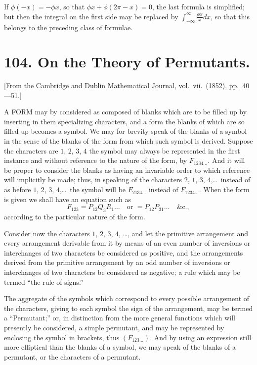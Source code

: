 \documentclass[11pt,a4paper]{article}
\theoremstyle{plain}
\begin{document}
If $\phi(-x) = -\phi x$, so that $\phi x + \phi(2\pi - x) = 0$, the last formula is simplified; but then the integral on the first side may be replaced by $\int_{-\infty}^{\infty} \frac{\phi x}{x} dx$, so that this belongs to the preceding class of formulae.
\clearpage


\section*{104. On the Theory of Permutants.}

[From the Cambridge and Dublin Mathematical Journal, vol.\ vii.\ (1852), pp.\ 40---51.]

A FORM may by considered as composed of blanks which are to be filled up by inserting in them specializing characters, and a form the blanks of which are so filled up becomes a symbol. We may for brevity speak of the blanks of a symbol in the sense of the blanks of the form from which such symbol is derived. Suppose the characters are $1$, $2$, $3$, $4$ the symbol may always be represented in the first instance and without reference to the nature of the form, by $F_{1234\ldots}$. And it will be proper to consider the blanks as having an invariable order to which reference will implicitly be made; thus, in speaking of the characters $2$, $1$, $3$, $4$,\ldots\ instead of as before $1$, $2$, $3$, $4$,\ldots\ the symbol will be $F_{2134\ldots}$ instead of $F_{1234\ldots}$. When the form is given we shall have an equation such as
\[F_{123} = P_{12} Q_3 R_1 \ldots \quad \text{or } = P_{12} P_{31} \ldots \quad \&\text{c.},\]
according to the particular nature of the form.

Consider now the characters $1$, $2$, $3$, $4$, \ldots, and let the primitive arrangement and every arrangement derivable from it by means of an even number of inversions or interchanges of two characters be considered as positive, and the arrangements derived from the primitive arrangement by an odd number of inversions or interchanges of two characters be considered as negative; a rule which may be termed ``the rule of signs.''

The aggregate of the symbols which correspond to every possible arrangement of the characters, giving to each symbol the sign of the arrangement, may be termed a ``Permutant;'' or, in distinction from the more general functions which will presently be considered, a simple permutant, and may be represented by enclosing the symbol in brackets, thus $(F_{123\ldots})$. And by using an expression still more elliptical than the blanks of a symbol, we may speak of the blanks of a permutant, or the characters of a permutant.
\end{document}
